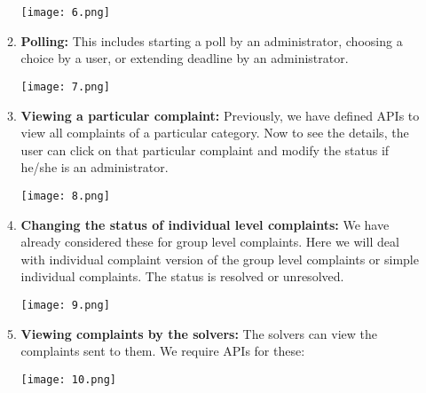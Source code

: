\documentclass{article}
\begin{document}
\begin{itemize}
\begin{enumerate}
\begin{minipage}{\linewidth}
	        
	        \texttt{[image: 6.png]}
            \end{minipage}
            \newline
            
\item \textbf{Polling:} This includes starting a poll by an administrator, choosing a choice by a user, or extending deadline by an administrator.
\begin{minipage}{\linewidth}
	       
	        \texttt{[image: 7.png]}
            \end{minipage}
            \newline
\item \textbf{Viewing a particular complaint:} Previously, we have defined APIs to view all complaints of a particular category. Now to see the details, the user can click on that particular complaint and modify the status if he/she is an administrator.
\newline
\begin{minipage}{\linewidth}
	       
	        \texttt{[image: 8.png]}
            \end{minipage}
            \newline
\item \textbf{Changing the status of individual level complaints: }
We have already considered these for group level complaints. Here we will deal with individual complaint version of the group level complaints or simple individual complaints. The status is resolved or unresolved.
\newline
\begin{minipage}{\linewidth}
	       
	        \texttt{[image: 9.png]}
            \end{minipage}
            \newline
\item \textbf{Viewing complaints by the solvers:}
The solvers can view the complaints sent to them. We require APIs for these:
\newline
\begin{minipage}{\linewidth}
	       
	        \texttt{[image: 10.png]}
            \end{minipage}
            \newline
\newpage

\end{enumerate}
\end{itemize}
\end{document}

